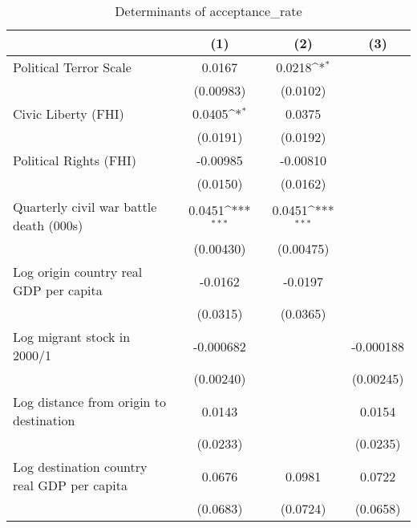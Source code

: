 \begin{table}[htbp]\centering
\def\sym#1{\ifmmode^{#1}\else\(^{#1}\)\fi}
\caption{Determinants of acceptance\_rate}
\begin{tabular}{l*{3}{c}}
\hline\hline
                    &\multicolumn{1}{c}{(1)}         &\multicolumn{1}{c}{(2)}         &\multicolumn{1}{c}{(3)}         \\
\hline
Political Terror Scale&      0.0167         &      0.0218\sym{*}  &                     \\
                    &   (0.00983)         &    (0.0102)         &                     \\
[1em]
Civic Liberty (FHI) &      0.0405\sym{*}  &      0.0375         &                     \\
                    &    (0.0191)         &    (0.0192)         &                     \\
[1em]
Political Rights (FHI)&    -0.00985         &    -0.00810         &                     \\
                    &    (0.0150)         &    (0.0162)         &                     \\
[1em]
Quarterly civil war battle death (000s)&      0.0451\sym{***}&      0.0451\sym{***}&                     \\
                    &   (0.00430)         &   (0.00475)         &                     \\
[1em]
Log origin country real GDP per capita&     -0.0162         &     -0.0197         &                     \\
                    &    (0.0315)         &    (0.0365)         &                     \\
[1em]
Log migrant stock in 2000/1&   -0.000682         &                     &   -0.000188         \\
                    &   (0.00240)         &                     &   (0.00245)         \\
[1em]
Log distance from origin to destination&      0.0143         &                     &      0.0154         \\
                    &    (0.0233)         &                     &    (0.0235)         \\
[1em]
Log destination country real GDP per capita&      0.0676         &      0.0981         &      0.0722         \\
                    &    (0.0683)         &    (0.0724)         &    (0.0658)         \\

\end{tabular}
\end{table}
